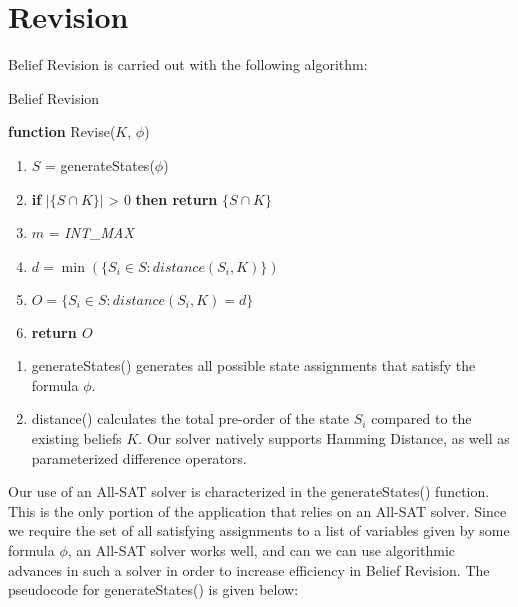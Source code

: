 \documentclass[english]{article}
\begin{document}
\section{Revision}

Belief Revision is carried out with the following algorithm:

\begin{algorithm}[H]
\caption{Belief Revision}

\textbf{function} Revise($K$, $\phi$)
\begin{enumerate}
\item $S$ = generateStates($\phi$)
\item \textbf{if }$|\{S\cap K\}|$ > 0 \textbf{then return }$\{S\cap K\}$
\item $m$ = \emph{INT\_MAX}
\item $d=\min(\{S_{i}\in S:distance(S_{i},K)\})$
\item $O=\{S_{i}\in S:distance(S_{i},K)=d\}$
\item \textbf{return $O$}
\end{enumerate}
\end{algorithm}

\begin{enumerate}
\item generateStates() generates all possible state assignments that satisfy
the formula $\phi$.
\item distance() calculates the total pre-order of the state $S_{i}$ compared
to the existing beliefs $K$. Our solver natively supports Hamming
Distance, as well as parameterized difference operators.
\end{enumerate}
Our use of an All-SAT solver is characterized in the generateStates()
function. This is the only portion of the application that relies
on an All-SAT solver. Since we require the set of all satisfying assignments
to a list of variables given by some formula $\phi$, an All-SAT solver
works well, and can we can use algorithmic advances in such a solver
in order to increase efficiency in Belief Revision. The pseudocode
for generateStates() is given below:
\end{document}

